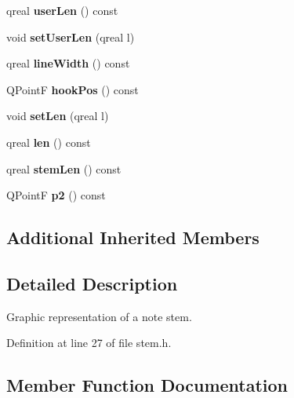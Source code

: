 \begin{DoxyCompactItemize}
\mbox{\label{class_ms_1_1_stem_af0f2327127f571dfe3c07a8565a31a5c}} 
qreal {\bfseries user\+Len} () const
\item 
\mbox{\label{class_ms_1_1_stem_a7f8af4ac13bb4e829d239703116f83c7}} 
void {\bfseries set\+User\+Len} (qreal l)
\item 
\mbox{\label{class_ms_1_1_stem_aadcbdc10cbafbc7486be0092097fae12}} 
qreal {\bfseries line\+Width} () const
\item 
\mbox{\label{class_ms_1_1_stem_a27fb7f82d5ae95bb9e619a90ec4e09aa}} 
Q\+PointF {\bfseries hook\+Pos} () const
\item 
\mbox{\label{class_ms_1_1_stem_af82b7550b3812ab906901aa32efe0e2b}} 
void {\bfseries set\+Len} (qreal l)
\item 
\mbox{\label{class_ms_1_1_stem_a3942a642bb5e2dd80de75ab5497deb95}} 
qreal {\bfseries len} () const
\item 
\mbox{\label{class_ms_1_1_stem_afbb6c776d4e5a2347ad4d7a3ef4e64e7}} 
qreal {\bfseries stem\+Len} () const
\item 
\mbox{\label{class_ms_1_1_stem_ab86a81e498e1f8cc1029b3e6160f717a}} 
Q\+PointF {\bfseries p2} () const
\end{DoxyCompactItemize}
\subsection*{Additional Inherited Members}


\subsection{Detailed Description}
Graphic representation of a note stem. 

Definition at line 27 of file stem.\+h.



\subsection{Member Function Documentation}
\mbox{\label{class_ms_1_1_stem_ac3edf3dc5966fcded6e5fcc8f1fb13d6}} 
